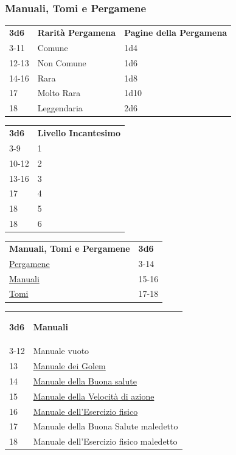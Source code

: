 \begin{multicols}{2}
{\subsubsection{Manuali, Tomi e Pergamene}\hypertarget{manualitomi}{}\label{manualitomi}\label{CPergamene}\hypertarget{CPergamene}{}

{\small \begin{tabularx}{0.48\textwidth}{lll}
\textbf{3d6} & \textbf{Rarità Pergamena} & \textbf{Pagine della Pergamena}\\
3-11 &Comune & 1d4 \\
12-13 &Non Comune & 1d6 \\
14-16 &Rara & 1d8 \\
17 & Molto Rara & 1d10\\
18 & Leggendaria & 2d6\\
\end{tabularx}}

\medskip

{\small \begin{tabularx}{0.48\textwidth}{ll}
	\textbf{3d6} & \textbf{Livello Incantesimo}\\
	3-9 & 1 \\
	10-12 & 2 \\
	13-16 & 3  \\
	17 & 4  \\
	18 & 5 \\
	18 & 6 \\
\end{tabularx}}


\medskip

{\small\begin{tabularx}{0.45\textwidth}{lX}
		\textbf{Manuali, Tomi e Pergamene}&\textbf{3d6}\\
		\hyperlink{manualitomi}{Pergamene} &3-14\\
		\hyperlink{manualitomi}{Manuali} &15-16\\
		\hyperlink{manualitomi}{Tomi} &17-18
\end{tabularx}}

\medskip


\begin{tabularx}{0.45\textwidth}{lX}\hypertarget{Manuali}{}
\textbf{3d6} & \textbf{Manuali}\\
3-12 & Manuale vuoto\\
13 & \hyperlink{ManualedeiGolem}{Manuale dei Golem}\\
14 & \hyperlink{ManualedellaBuonasalute}{Manuale della Buona salute}\\
15 & \hyperlink{ManualedellaVelocitàdiazione}{Manuale della Velocità di azione}\\
16 & \hyperlink{Manualedell'Eserciziofisico}{Manuale dell'Esercizio fisico}\\
17 & Manuale della Buona Salute maledetto\\
18 & Manuale dell'Esercizio fisico maledetto
\end{tabularx}

}
\end{multicols}
